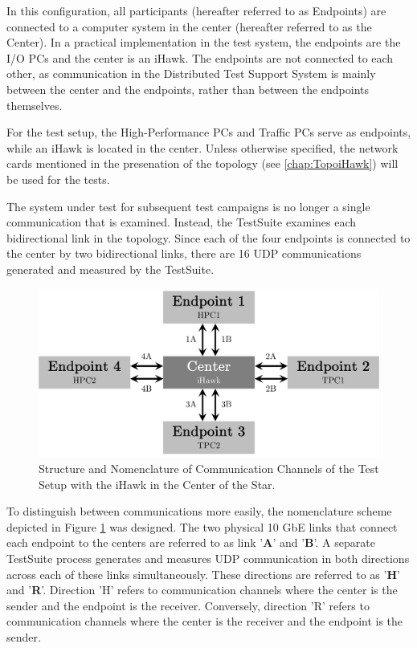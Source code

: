 In this configuration, all participants (hereafter referred to as Endpoints) are connected to a computer system in the center (hereafter referred to as the Center). In a practical implementation in the test system, the endpoints are the I/O PCs and the center is an iHawk. The endpoints are not connected to each other, as communication in the Distributed Test Support System is mainly between the center and the endpoints, rather than between the endpoints themselves.

For the test setup, the High-Performance PCs and Traffic PCs serve as endpoints, while an iHawk is located in the center. Unless otherwise specified, the network cards mentioned in the presenation of the topology (see \ref{chap:TopoiHawk}) will be used for the tests.

The system under test for subsequent test campaigns is no longer a single communication that is examined. Instead, the TestSuite examines each bidirectional link in the topology. Since each of the four endpoints is connected to the center by two bidirectional links, there are 16 UDP communications generated and measured by the TestSuite.

\begin{figure}[h!]
    \centering
    \includegraphics[width=0.8\linewidth]{figures/reliability/ihawk/topo.pdf}
    \caption{Structure and Nomenclature of Communication Channels of the Test Setup with the iHawk in the Center of the Star.}
    \label{fig:topoihawknaming}
\end{figure}

To distinguish between communications more easily, the nomenclature scheme depicted in Figure \ref{fig:topoihawknaming} was designed. The two physical 10 GbE links that connect each endpoint to the centers are referred to as link '\textbf{A}' and '\textbf{B}'. A separate TestSuite process generates and measures UDP communication in both directions across each of these links simultaneously. These directions are referred to as '\textbf{H}' and '\textbf{R}'. Direction 'H' refers to communication channels where the center is the sender and the endpoint is the receiver. Conversely, direction 'R' refers to communication channels where the center is the receiver and the endpoint is the sender.

